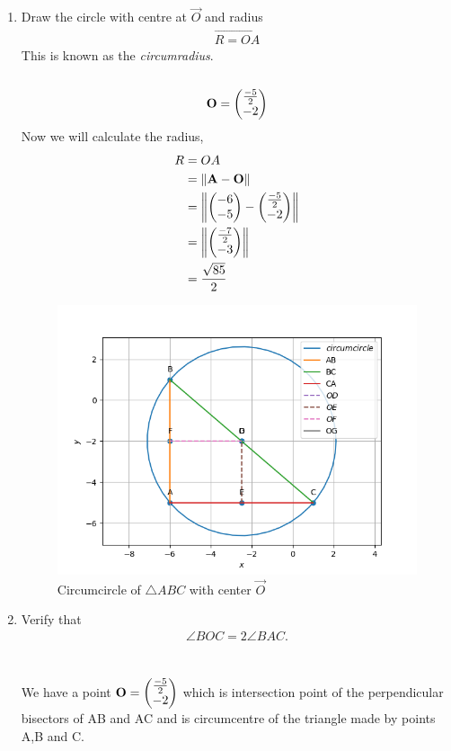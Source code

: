 \documentclass[11pt]{book}
\begin{document}
\begin{enumerate}[label=\thesection.\arabic*.,ref=\thesection.\theenumi]
	\item Draw the circle with centre at $\vec{O}$ and radius 
		\begin{align}
			\vec{R = OA}
		\end{align}
		This is known as the {\em circumradius}. \\
  \solution\\
  \begin{align}
\mathbf{O} = \begin{pmatrix}\frac{-5}{2} \\ -2\end{pmatrix}
\end{align}
Now we will calculate the radius,
\begin{align}
      R &= OA\\
        &= \left\lVert\mathbf{A} - \mathbf{O}\right\rVert\\
        &= \left\lVert\begin{pmatrix}-6 \\ -5\end{pmatrix} - \begin{pmatrix}\frac{-5}{2} \\ -2\end{pmatrix}\right\rVert\\
        &= \left\lVert\begin{pmatrix}\frac{-7}{2} \\ -3\end{pmatrix}\right\rVert\\
        &= \frac{\sqrt{85}}{2}
\end{align}
\begin{figure}[H]                                                                                       \includegraphics[width=\columnwidth]{figs/circumference.png}
        \caption{Circumcircle of $\triangle ABC$ with center $\vec{O}$}
\label{fig:circumcircle}
\end{figure}

\item Verify that 
		\begin{align}
			\angle BOC = 2\angle BAC.
		\end{align}\\
\solution\\
We have a point $\mathbf{O} = \begin{pmatrix}\frac{-5}{2} \\ -2\end{pmatrix}$
which is intersection point of the perpendicular bisectors of AB and AC and is circumcentre of the triangle made by points A,B and C.


\end{enumerate}
\end{document}
